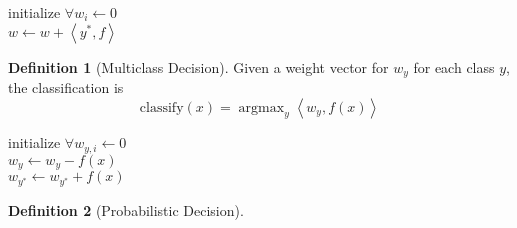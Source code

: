 \documentclass[11pt]{article}
\theoremstyle{definition}
\newtheorem{definition}{Definition}[section]
\theoremstyle{remark}
\DeclareMathOperator*{\argmax}{argmax}
\begin{document}
\begin{algorithm}
    \caption{Binary Perceptron}

    
    \DontPrintSemicolon
    
    initialize $\forall w_i \gets 0$ \\
     {
    		$w \gets w + \left< y^*,f \right>$
    }
    
\end{algorithm}

\begin{definition}[Multiclass Decision] Given a weight vector for $w_y$ for each class $y$, the classification is
\[
\mathrm{classify}(x) = \argmax_y \left< w_y, f(x) \right>
\]
\end{definition}

\begin{algorithm}
    \caption{Multiclass Perceptron}

    
    \DontPrintSemicolon
    
    initialize $\forall w_{y,i} \gets 0$ \\
     {
    		$w_y \gets w_y - f(x)$ \\
    		$w_{y^*} \gets w_{y^*} + f(x)$
    }
    
\end{algorithm}

\begin{definition}[Probabilistic Decision]

\end{definition}
\end{document}
